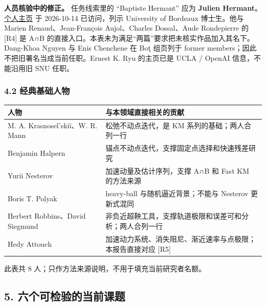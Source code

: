 \documentclass[
  chinese,
  10pt,
  a4paper,
]{article}
\newcounter{none} %
\begin{document}
\textbf{人员核验中的修正。} 任务线索里的 ``Baptiste Hermant'' 应为
\textbf{Julien Hermant}。\href{https://j-hermant.github.io/}{个人主页}
于 2026-10-14 已访问，列示 University of Bordeaux 博士生。他与 Marien
Renaud、Jean-François Aujol、Charles Dossal、Aude Rondepierre 的
{[}R4{]} 是 A∩B
的直接入口。本表未为满足``两篇''要求把未核实作品加入其名下。Dang-Khoa
Nguyen 与 Enis Chenchene 在 Boţ 组页列于 former
members；因此不把旧署名当成当前任职。Ernest K. Ryu 的主页已是 UCLA /
OpenAI 信息，不能沿用旧 SNU 任职。

\subsubsection{4.2
经典基础人物}\label{ux7ecfux5178ux57faux7840ux4ebaux7269}

{\def\LTcaptype{none} %
\begin{longtable}[]{@{}
  >{\raggedright\arraybackslash}p{}
  >{\raggedright\arraybackslash}p{}@{}}
\toprule\noalign{}
\begin{minipage}[b]{\linewidth}\raggedright
人物
\end{minipage} & \begin{minipage}[b]{\linewidth}\raggedright
与本领域直接相关的贡献
\end{minipage} \\
\midrule\noalign{}
\endhead
\bottomrule\noalign{}
\endlastfoot
M. A. Krasnosel'skiĭ、W. R. Mann & 松弛不动点迭代，是 KM
系列的基础；两人合列一行 \\
Benjamin Halpern & 锚点不动点迭代，支撑固定点选择和快速残差研究 \\
Yurii Nesterov & 加速动量及估计序列，支撑 A∩B 和 Fast KM 的方法来源 \\
Boris T. Polyak & heavy-ball 与随机逼近背景；不能与 Nesterov
更新式混同 \\
Herbert Robbins、David Siegmund &
非负近超鞅工具，支撑轨道极限和误差可和分析；两人合列一行 \\
Hedy Attouch & 加速动力系统、消失阻尼、渐近速率与点极限；本报告直接对应
{[}R5{]} \\
\end{longtable}
}

此表共 8 人；只作方法来源说明，不用于填充当前研究者名额。

\subsection{5.
六个可检验的当前课题}\label{ux516dux4e2aux53efux68c0ux9a8cux7684ux5f53ux524dux8bfeux9898}
\end{document}

